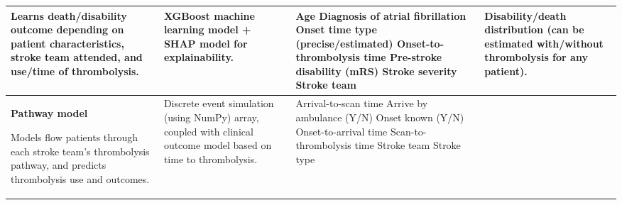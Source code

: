 \begin{landscape}
{\begin{table}
\begin{tabular}{|p{5cm}|p{5cm}|p{6cm}|p{6cm}|}
\vspace{3mm}

Learns death/disability outcome depending on patient characteristics, stroke team attended, and use/time of thrombolysis. &

XGBoost machine learning model + SHAP model for explainability. &

Age\newline\vspace{2pt}
Diagnosis of atrial fibrillation\newline\vspace{2pt}
Onset time type (precise/estimated)\newline\vspace{2pt}
Onset-to-thrombolysis time\newline\vspace{2pt}
Pre-stroke disability (mRS)\newline\vspace{2pt}
Stroke severity\newline\vspace{2pt}
Stroke team\newline &

Disability/death distribution (can be estimated with/without thrombolysis for any patient). \\

\hline


\textbf{Pathway model}

\vspace{3mm}

Models flow patients through each stroke team’s thrombolysis pathway, and predicts thrombolysis use and outcomes. &

Discrete event simulation (using NumPy) array, coupled with clinical outcome model based on time to thrombolysis. &

Arrival-to-scan time\newline\vspace{2pt}
Arrive by ambulance (Y/N)\newline\vspace{2pt}
Onset known (Y/N)\newline\vspace{2pt}
Onset-to-arrival time\newline\vspace{2pt}
Scan-to-thrombolysis time\newline\vspace{2pt}
Stroke team\newline\vspace{2pt}
Stroke type &


\end{tabular}
\end{table}}
\end{landscape}
